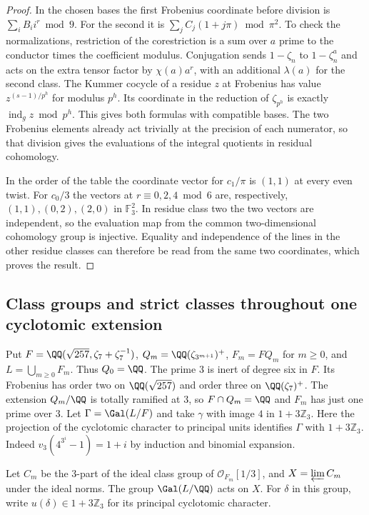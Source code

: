 \documentclass[a4paper,11pt]{article}
\theoremstyle{definition}
\theoremstyle{remark}
\newcommand{\ZZ}{\mathbb Z}\newcommand{\ord}{\operatorname{ord}}
\numberwithin{equation}{section}
\begin{document}
\begin{proof}
In the chosen bases the first Frobenius coordinate before
division is \(\sum_iB_i i^r\bmod9\). For the second it is
\(\sum_jC_j(1+j\pi)\bmod\pi^2\). To check the normalizations,
restriction of the corestriction is a sum over \(a\) prime to
the conductor times the coefficient modulus. Conjugation
sends \(1-\zeta_n\) to \(1-\zeta_n^a\) and acts on the extra
tensor factor by \(\chi(a)a^r\), with an additional
\(\lambda(a)\) for the second class. The Kummer cocycle of a
residue \(z\) at Frobenius has value \(z^{(s-1)/p^h}\) for
modulus \(p^h\). Its coordinate in the reduction of
\(\zeta_{p^h}\) is exactly \(\operatorname{ind}_g z\bmod p^h\).
This gives both formulas with compatible bases. The two
Frobenius elements already act trivially at the precision of
each numerator, so that division gives the evaluations of
the integral quotients in residual cohomology.

In the order of the table the coordinate vector for \(c_1/\pi\)
is \((1,1)\) at every even twist. For \(c_0/3\) the vectors at
\(r\equiv0,2,4\bmod6\) are, respectively,
\((1,1),(0,2),(2,0)\) in \(\mathbb F_3^2\).
In residue class two the two vectors are independent, so the
evaluation map from the common two-dimensional cohomology
group is injective. Equality and independence of the lines
in the other residue classes can therefore be read from the
same two coordinates, which proves the result.
\end{proof}

\subsection{Class groups and strict classes throughout one cyclotomic extension}\label{nav:III-53}
Put \(F=\QQ(\sqrt{257},\zeta_7+\zeta_7^{-1})\),
\(Q_m=\QQ(\zeta_{3^{m+1}})^+\), \(F_m=FQ_m\) for \(m\ge0\),
and \(L=\bigcup_{m\ge0}F_m\). Thus \(Q_0=\QQ\).
The prime \(3\) is inert of degree six in \(F\). Its Frobenius
has order two on \(\QQ(\sqrt{257})\) and order three on
\(\QQ(\zeta_7)^+\). The extension \(Q_m/\QQ\) is totally
ramified at \(3\), so \(F\cap Q_m=\QQ\) and \(F_m\) has just
one prime over \(3\). Let \(\Gamma=\Gal(L/F)\) and take
\(\gamma\) with image \(4\) in \(1+3\ZZ_3\).
Here the projection of the cyclotomic character to principal
units identifies \(\Gamma\) with \(1+3\ZZ_3\). Indeed
\(v_3(4^{3^i}-1)=1+i\) by induction and binomial expansion.

Let \(C_m\) be the \(3\)-part of the ideal class group of
\(\mathcal O_{F_m}[1/3]\), and \(X=\varprojlim C_m\) under
the ideal norms. The group \(\Gal(L/\QQ)\) acts on \(X\).
For \(\delta\) in this group, write \(u(\delta)\in1+3\ZZ_3\)
for its principal cyclotomic character.
\end{document}
